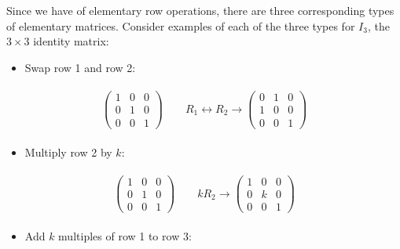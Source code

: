 \documentclass[letterpaper,10pt,english]{jupyterBook}
\begin{document}
\sphinxAtStartPar
Since we have {\hyperref[\detokenize{_pages/2.3_Gaussian_elimination:ero-definition}]{}} of elementary row operations, there are three corresponding types of elementary matrices. Consider examples of each of the three types for \(I_3\), the \(3 \times 3\) identity matrix:
\begin{itemize}
\item {} 
\sphinxAtStartPar
Swap row 1 and row 2:

\end{itemize}
\begin{equation*}
\begin{split} \begin{align*}
    \begin{pmatrix} 1 & 0 & 0 \\ 0 & 1 & 0 \\ 0 & 0 & 1 \end{pmatrix}
    \qquad R_1 \leftrightarrow R_2 \longrightarrow
    \begin{pmatrix} 0 & 1 & 0 \\ 1 & 0 & 0 \\ 0 & 0 & 1 \end{pmatrix}
\end{align*} \end{split}
\end{equation*}\begin{itemize}
\item {} 
\sphinxAtStartPar
Multiply row 2 by \(k\):

\end{itemize}
\begin{equation*}
\begin{split} \begin{align*}
    \begin{pmatrix} 1 & 0 & 0 \\ 0 & 1 & 0 \\ 0 & 0 & 1 \end{pmatrix}
    \qquad kR_2 \longrightarrow
    \begin{pmatrix} 1 & 0 & 0 \\ 0 & k & 0 \\ 0 & 0 & 1 \end{pmatrix}
\end{align*} \end{split}
\end{equation*}\begin{itemize}
\item {} 
\sphinxAtStartPar
Add \(k\) multiples of row 1 to row 3:

\end{itemize}
\end{document}
